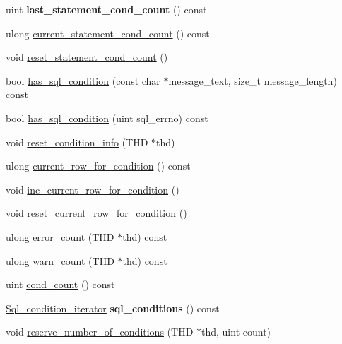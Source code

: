 \begin{DoxyCompactItemize}
uint {\bfseries last\+\_\+statement\+\_\+cond\+\_\+count} () const
\item 
ulong \mbox{\hyperlink{classDiagnostics__area_a76c5d8c11b00ca7655e2c8962e0327eb}{current\+\_\+statement\+\_\+cond\+\_\+count}} () const
\item 
void \mbox{\hyperlink{classDiagnostics__area_abcfdd87b7a95d4e391114285141e1a53}{reset\+\_\+statement\+\_\+cond\+\_\+count}} ()
\item 
bool \mbox{\hyperlink{classDiagnostics__area_afa19c24615d1d20dd20562f3e5e7cb91}{has\+\_\+sql\+\_\+condition}} (const char $\ast$message\+\_\+text, size\+\_\+t message\+\_\+length) const
\item 
bool \mbox{\hyperlink{classDiagnostics__area_ad7aab3dc281defcc1d92a859b7375896}{has\+\_\+sql\+\_\+condition}} (uint sql\+\_\+errno) const
\item 
void \mbox{\hyperlink{classDiagnostics__area_a22c9a69c0c8bf0e8398a4d9c23d6dddc}{reset\+\_\+condition\+\_\+info}} (T\+HD $\ast$thd)
\item 
ulong \mbox{\hyperlink{classDiagnostics__area_a21f866b70d386e88bc576ed62ba7aaf0}{current\+\_\+row\+\_\+for\+\_\+condition}} () const
\item 
void \mbox{\hyperlink{classDiagnostics__area_a06030bceccad3221fa9bece84682e22f}{inc\+\_\+current\+\_\+row\+\_\+for\+\_\+condition}} ()
\item 
void \mbox{\hyperlink{classDiagnostics__area_accf24b22b93d017d4e652c0f25f733c9}{reset\+\_\+current\+\_\+row\+\_\+for\+\_\+condition}} ()
\item 
ulong \mbox{\hyperlink{classDiagnostics__area_a1e31909ab1b87614b6e7032bd6362760}{error\+\_\+count}} (T\+HD $\ast$thd) const
\item 
ulong \mbox{\hyperlink{classDiagnostics__area_add2a21980c4a8b65ccaed96e466976b9}{warn\+\_\+count}} (T\+HD $\ast$thd) const
\item 
uint \mbox{\hyperlink{classDiagnostics__area_ac101e4a8bc5d0780a118699c8ca7a775}{cond\+\_\+count}} () const
\item 
\mbox{\label{classDiagnostics__area_ad5380f5ec1c8941babdad6fffb208461}} 
\mbox{\hyperlink{classDiagnostics__area_a5302a0cdb7499883092d87a5b901b39d}{Sql\+\_\+condition\+\_\+iterator}} {\bfseries sql\+\_\+conditions} () const
\item 
void \mbox{\hyperlink{classDiagnostics__area_a05da9e199b031ca2213c132ccbe75866}{reserve\+\_\+number\+\_\+of\+\_\+conditions}} (T\+HD $\ast$thd, uint count)

\end{DoxyCompactItemize}

